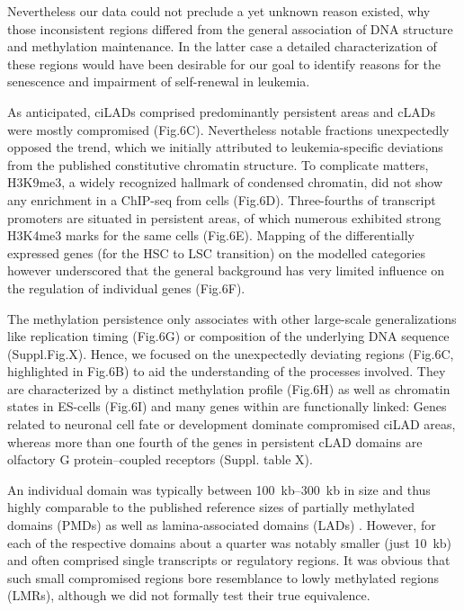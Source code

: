 Nevertheless our data could not preclude a yet unknown reason existed, why those inconsistent regions differed from the general association of DNA structure and methylation maintenance. In the latter case a detailed characterization of these regions would have been desirable for our goal to identify reasons for the senescence and impairment of self-renewal in \dnmtchip leukemia.


As anticipated, ciLADs comprised predominantly persistent areas and cLADs were mostly compromised (Fig.6C). Nevertheless notable fractions unexpectedly opposed the trend, which we initially attributed to leukemia-specific deviations from the published constitutive chromatin structure. To complicate matters, H3K9me3, a widely recognized hallmark of condensed chromatin, did not show any enrichment in a ChIP-seq from \dnmtwt cells (Fig.6D). Three-fourths of transcript promoters are situated in persistent areas, of which numerous exhibited strong H3K4me3 marks for the same cells (Fig.6E). Mapping of the differentially expressed genes (for the HSC to LSC transition) on the modelled categories however underscored that the general background has very limited influence on the regulation of individual genes (Fig.6F). 

The methylation persistence only associates with other large-scale generalizations like replication timing (Fig.6G) or composition of the underlying DNA sequence (Suppl.Fig.X). Hence, we focused on the unexpectedly deviating regions (Fig.6C, highlighted in Fig.6B) to aid the understanding of the processes involved. They are characterized by a distinct methylation profile (Fig.6H) as well as chromatin states in ES-cells (Fig.6I) and many genes within are functionally linked: Genes related to neuronal cell fate or development dominate compromised ciLAD areas, whereas more than one fourth of the genes in persistent cLAD domains are olfactory G protein–coupled receptors (Suppl. table X). 


An individual domain was typically between \SIrange{100}{300}{\kilo b} in size and thus highly comparable to the published reference sizes of partially methylated domains (PMDs)\cite{Lister2009,Schroeder2013,Gaidatzis2014} as well as lamina-associated domains (LADs)\cite{Guelen2008} . However, for each of the respective domains about a quarter was notably smaller (just \SI{10}{\kilo b}) and often comprised single transcripts or regulatory regions. It was obvious that such small compromised regions bore resemblance to lowly methylated regions (LMRs)\cite{Stadler2011}, although we did not formally test their true equivalence. 

